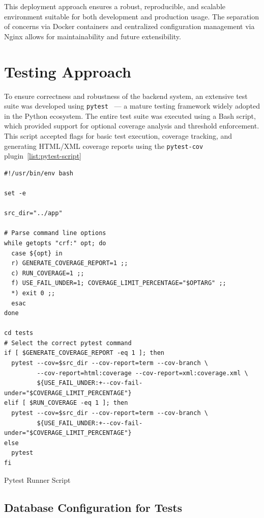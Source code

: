This deployment approach ensures a robust, reproducible, and scalable environment suitable for both development and production usage. The separation of concerns via Docker containers and centralized configuration management via Nginx allows for maintainability and future extensibility.

\section{Testing Approach}

To ensure correctness and robustness of the backend system, an extensive test suite was developed using \texttt{pytest}~\cite{Pytest} --- a mature testing framework widely adopted in the Python ecosystem. The entire test suite was executed using a Bash script, which provided support for optional coverage analysis and threshold enforcement. This script accepted flags for basic test execution, coverage tracking, and generating HTML/XML coverage reports using the \texttt{pytest-cov} plugin~\ref{list:pytest-script}

\begin{listing}
  \begin{verbatim}
#!/usr/bin/env bash

set -e

src_dir="../app"

# Parse command line options
while getopts "crf:" opt; do
  case ${opt} in
  r) GENERATE_COVERAGE_REPORT=1 ;;
  c) RUN_COVERAGE=1 ;;
  f) USE_FAIL_UNDER=1; COVERAGE_LIMIT_PERCENTAGE="$OPTARG" ;;
  *) exit 0 ;;
  esac
done

cd tests
# Select the correct pytest command
if [ $GENERATE_COVERAGE_REPORT -eq 1 ]; then
  pytest --cov=$src_dir --cov-report=term --cov-branch \
         --cov-report=html:coverage --cov-report=xml:coverage.xml \
         ${USE_FAIL_UNDER:+--cov-fail-under="$COVERAGE_LIMIT_PERCENTAGE"}
elif [ $RUN_COVERAGE -eq 1 ]; then
  pytest --cov=$src_dir --cov-report=term --cov-branch \
         ${USE_FAIL_UNDER:+--cov-fail-under="$COVERAGE_LIMIT_PERCENTAGE"}
else
  pytest
fi
\end{verbatim}
\caption{Pytest Runner Script}
\label{list:pytest-script}
\end{listing}

\subsection{Database Configuration for Tests}

